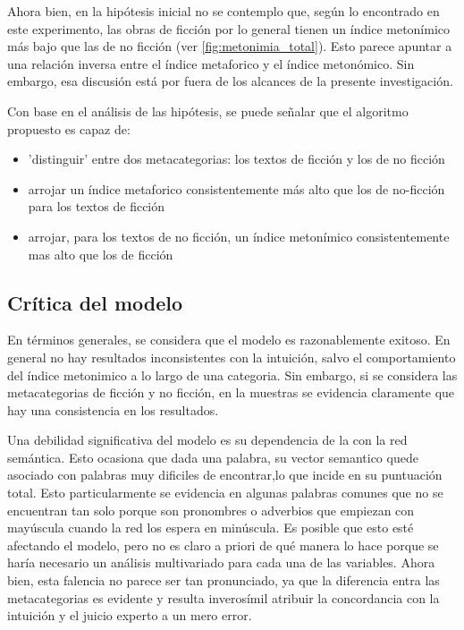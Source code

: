 \documentclass[12pt,letterpaper,twoside]{article}
\begin{document}
Ahora bien, en la hipótesis inicial no se contemplo que, según lo
encontrado en este experimento, las obras de ficción por lo general
tienen un índice metonímico más bajo que las de no ficción (ver \ref{fig:metonimia_total}). Esto
parece apuntar a una relación inversa entre el índice metaforico
y el índice metonómico. Sin embargo, esa discusión está por fuera
de los alcances de la presente investigación.


Con base en el análisis de las hipótesis, se puede señalar que
el algoritmo propuesto es capaz de:

\begin{itemize}
\item 'distinguir' entre dos metacategorias: los textos de ficción y los de no ficción
\item arrojar un índice metaforico consistentemente más alto que los de no-ficción para los textos de ficción
\item arrojar, para los textos de no ficción, un índice metonímico consistentemente mas alto que los de ficción
\end{itemize}

\subsection{Crítica del modelo}
\label{sec:org27cdc3c}


En términos generales, se considera que el modelo es razonablemente
exitoso. En general no hay resultados inconsistentes con la intuición,
salvo el comportamiento del índice metonimico a lo largo de una
categoria. Sin embargo, si se considera las metacategorias de ficción
y no ficción, en la muestras se evidencia claramente que hay una
consistencia en los resultados.

Una debilidad significativa del modelo es su dependencia de la con la
red semántica. Esto ocasiona que dada una palabra, su vector semantico
quede asociado con palabras muy dificiles de encontrar,lo que incide
en su puntuación total. Esto particularmente se evidencia en algunas
palabras comunes que no se encuentran tan solo porque son pronombres o
adverbios que empiezan con mayúscula cuando la red los espera en
minúscula. Es posible que esto esté afectando el modelo, pero no es
claro a priori de qué manera lo hace porque se haría necesario un
análisis multivariado para cada una de las variables. Ahora bien, esta
falencia no parece ser tan pronunciado, ya que la diferencia entra las
metacategorias es evidente y resulta inverosímil atribuir la
concordancia con la intuición y el juicio experto a un mero error.
\end{document}
